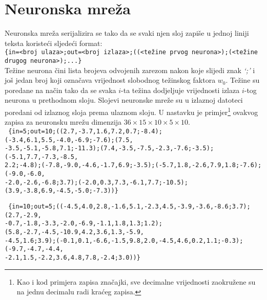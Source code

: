 \texttt{}
\normalsize

\section*{Neuronska mreža}
Neuronska mreža serijalizira se tako da se svaki njen sloj zapiše u jednoj liniji teksta koristeći sljedeći
format:\\
\footnotesize
\texttt{\{in=<broj ulaza>;out=<broj izlaza>;((<težine prvog neurona>);(<težine drugog neurona>);...\}}\\
\normalsize
Težine neurona čini lista brojeva odvojenih zarezom nakon koje slijedi znak \emph{`;'} i još jedan broj koji označava
vrijednost slobodnog težinskog faktora $w_0$. Težine su poredane na način tako da se svaka $i$-ta težina dodjeljuje
vrijednosti izlaza $i$-tog neurona u prethodnom sloju. Slojevi neuronske mreže su u izlaznoj datoteci poredani od
izlaznog sloja prema ulaznom sloju. U nastavku je primjer\footnote{Kao i kod primjera zapisa značajki, sve decimalne
vrijednosti zaokružene su na jednu decimalu radi kraćeg zapisa.} ovakvog zapisa za neuronsku mrežu dimenzija
$36 \times 15 \times 10 \times 5 \times 10$.\\

\scriptsize
\texttt{
\{in=5;out=10;((2.7,-3.7,1.6,7.2,0.7;-8.4);(-3.4,6.1,5.5,-4.0,-6.9;-7.6);(7.5,\\
-3.5,-5.1,-5.8,7.1;-11.3);(7.4,-3.5,-7.5,-2.3,-7.6;-3.5);(-5.1,7.7,-7.3,-8.5,\\
2.2;-4.8);(-7.8,-9.0,-4.6,-1.7,6.9;-3.5);(-5.7,1.8,-2.6,7.9,1.8;-7.6);(-9.0,-6.0,\\
-2.0,-2.6,-6.8;3.7);(-2.0,0.3,7.3,-6.1,7.7;-10.5);(3.9,-3.8,6.9,-4.5,-5.0;-7.3))\}\\
}

\texttt{
\{in=10;out=5;((-4.5,4.0,2.8,-1.6,5.1,-2.3,4.5,-3.9,-3.6,-8.6;3.7);(2.7,-2.9,\\
-0.7,-1.8,-3.3,-2.0,-6.9,-1.1,1.8,1.3;1.2);(5.8,-2.7,-4.5,-10.9,4.2,3.6,1.3,-5.9,\\
-4.5,1.6;3.9);(-0.1,0.1,-6.6,-1.5,9.8,2.0,-4.5,4.6,0.2,1.1;-0.3);(-9.7,-4.7,-4.4,\\
-2.1,1.5,-2.2,3.6,4.8,7.8,-2.4;3.0))\}\\
}

